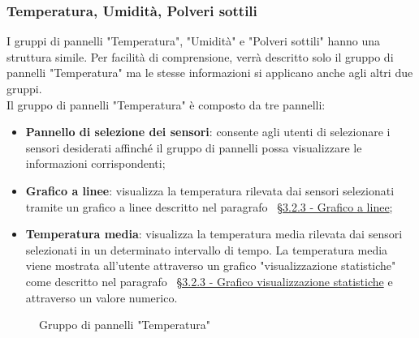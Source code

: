 \subsubsection{Temperatura, Umidità, Polveri sottili}
I gruppi di pannelli "Temperatura", "Umidità" e "Polveri sottili" hanno una struttura simile. Per facilità di comprensione, verrà descritto solo il gruppo di pannelli "Temperatura" ma le stesse informazioni si applicano anche agli altri due gruppi.\\ 
Il gruppo di pannelli "Temperatura" è composto da tre pannelli:
\begin{itemize}
    \item \textbf{Pannello di selezione dei sensori}: consente agli utenti di selezionare i sensori desiderati affinché il gruppo di pannelli possa visualizzare le informazioni corrispondenti;
    \item \textbf{Grafico a linee}: visualizza la temperatura rilevata dai sensori selezionati tramite un grafico a linee descritto nel paragrafo  ~\hyperlink{par:grafico_linee}{\S 3.2.3 - Grafico a linee};
    \item \textbf{Temperatura media}: visualizza la temperatura media rilevata dai sensori selezionati in un determinato intervallo di tempo. La temperatura media viene mostrata all'utente attraverso un grafico "visualizzazione statistiche" come descritto nel paragrafo ~\hyperlink{par:visu_stat}{\S 3.2.3 - Grafico visualizzazione statistiche} e attraverso un valore numerico.
\end{itemize}
\begin{figure}[H]
    \centering
    \caption{Gruppo di pannelli "Temperatura"}
    \label{fig:my_label}
\end{figure}

